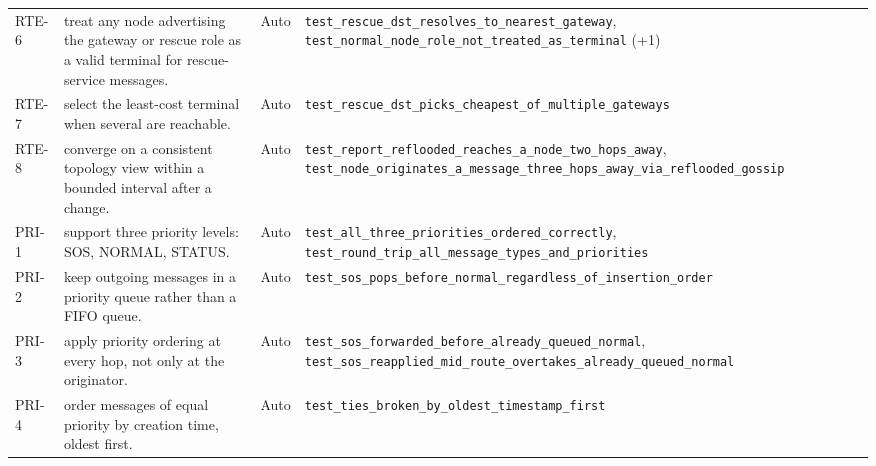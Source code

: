 \begin{longtable}{@{}p{0.95cm}p{6.6cm}p{1.15cm}p{8.6cm}@{}}
RTE-6 & treat any node advertising the gateway or rescue role as a valid terminal for rescue-service messages. & Auto & \texttt{test\_\allowbreak{}rescue\_\allowbreak{}dst\_\allowbreak{}resolves\_\allowbreak{}to\_\allowbreak{}nearest\_\allowbreak{}gateway}, \texttt{test\_\allowbreak{}normal\_\allowbreak{}node\_\allowbreak{}role\_\allowbreak{}not\_\allowbreak{}treated\_\allowbreak{}as\_\allowbreak{}terminal} (+1) \\
RTE-7 & select the least-cost terminal when several are reachable. & Auto & \texttt{test\_\allowbreak{}rescue\_\allowbreak{}dst\_\allowbreak{}picks\_\allowbreak{}cheapest\_\allowbreak{}of\_\allowbreak{}multiple\_\allowbreak{}gateways} \\
RTE-8 & converge on a consistent topology view within a bounded interval after a change. & Auto & \texttt{test\_\allowbreak{}report\_\allowbreak{}reflooded\_\allowbreak{}reaches\_\allowbreak{}a\_\allowbreak{}node\_\allowbreak{}two\_\allowbreak{}hops\_\allowbreak{}away}, \texttt{test\_\allowbreak{}node\_\allowbreak{}originates\_\allowbreak{}a\_\allowbreak{}message\_\allowbreak{}three\_\allowbreak{}hops\_\allowbreak{}away\_\allowbreak{}via\_\allowbreak{}reflooded\_\allowbreak{}gossip} \\
PRI-1 & support three priority levels: SOS, NORMAL, STATUS. & Auto & \texttt{test\_\allowbreak{}all\_\allowbreak{}three\_\allowbreak{}priorities\_\allowbreak{}ordered\_\allowbreak{}correctly}, \texttt{test\_\allowbreak{}round\_\allowbreak{}trip\_\allowbreak{}all\_\allowbreak{}message\_\allowbreak{}types\_\allowbreak{}and\_\allowbreak{}priorities} \\
PRI-2 & keep outgoing messages in a priority queue rather than a FIFO queue. & Auto & \texttt{test\_\allowbreak{}sos\_\allowbreak{}pops\_\allowbreak{}before\_\allowbreak{}normal\_\allowbreak{}regardless\_\allowbreak{}of\_\allowbreak{}insertion\_\allowbreak{}order} \\
PRI-3 & apply priority ordering at every hop, not only at the originator. & Auto & \texttt{test\_\allowbreak{}sos\_\allowbreak{}forwarded\_\allowbreak{}before\_\allowbreak{}already\_\allowbreak{}queued\_\allowbreak{}normal}, \texttt{test\_\allowbreak{}sos\_\allowbreak{}reapplied\_\allowbreak{}mid\_\allowbreak{}route\_\allowbreak{}overtakes\_\allowbreak{}already\_\allowbreak{}queued\_\allowbreak{}normal} \\
PRI-4 & order messages of equal priority by creation time, oldest first. & Auto & \texttt{test\_\allowbreak{}ties\_\allowbreak{}broken\_\allowbreak{}by\_\allowbreak{}oldest\_\allowbreak{}timestamp\_\allowbreak{}first} \\

\end{longtable}

